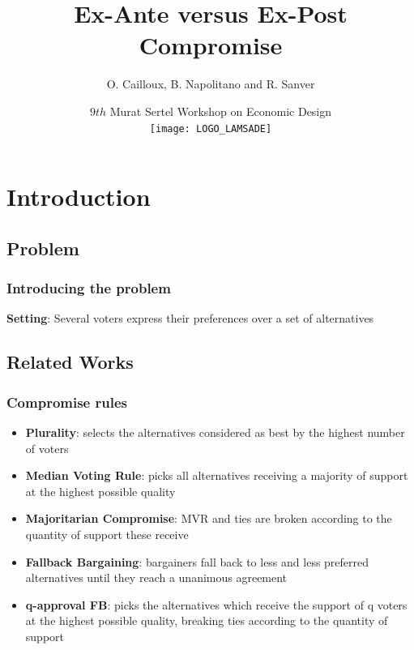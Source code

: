 \documentclass{beamer}
\title[Ex-Ante vs Ex-Post Compromise]{Ex-Ante versus Ex-Post Compromise}
\institute[]{LAMSADE, Université Paris-Dauphine, Paris, France}
\author[O. Cailloux, B. Napolitano, R. Sanver]{O. Cailloux, B. Napolitano and R. Sanver}
\date[31 Oct 2019]{{\small $9th$ Murat Sertel Workshop on Economic Design} \\ \texttt{[image: LOGO\_LAMSADE]} }
\begin{document}
\beamertemplatenavigationsymbolsempty

\begin{frame}[plain]
\maketitle
\end{frame}

\addtocounter{framenumber}{-1}


\section{Introduction}
\subsection{Problem}

\begin{frame}
\frametitle{Introducing the problem}
\textbf{Setting}: Several voters express their preferences over a set of alternatives \vspace{6mm}

\end{frame}

\subsection{Related Works}
\begin{frame}
	\frametitle{Compromise rules}
	\begin{itemize}
		\item<1-> \textbf{Plurality}: selects the alternatives considered as best by the highest number of voters 
		\item<2-> \textbf{Median Voting Rule}: picks all alternatives receiving a majority of support at the highest possible quality
		\item<3-> \textbf{Majoritarian Compromise}: MVR and ties are broken according to the quantity of support these receive
		\item<4-> \textbf{Fallback Bargaining}: bargainers fall back to less and less preferred alternatives until they reach a unanimous agreement 
		\item<5-> \textbf{q-approval FB}: picks the alternatives which receive the support of q voters at the highest possible quality, breaking ties according to the quantity of support
	\end{itemize}
\end{frame}
\end{document}
